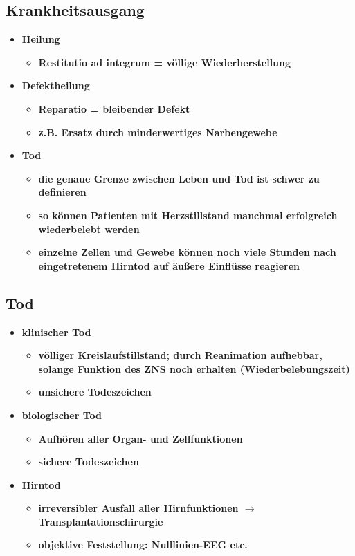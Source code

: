 \subsection{Krankheitsausgang}
	\begin{itemize}
		\item \textbf{Heilung}
			\begin{itemize}
				\item \textbf{Restitutio ad integrum = völlige Wiederherstellung}
			\end{itemize}
		\item \textbf{Defektheilung}
			\begin{itemize}
				\item \textbf{Reparatio = bleibender Defekt}
				\item \textbf{z.B. Ersatz durch minderwertiges Narbengewebe}
			\end{itemize}
		\item \textbf{Tod}
			\begin{itemize}
				\item \textbf{die genaue Grenze zwischen Leben und Tod ist schwer zu definieren}
				\item \textbf{so können Patienten mit Herzstillstand manchmal erfolgreich wiederbelebt werden}
				\item \textbf{einzelne Zellen und Gewebe können noch viele Stunden nach eingetretenem Hirntod auf äußere Einflüsse reagieren}
			\end{itemize}
	\end{itemize}

\subsection{Tod}
	\begin{itemize}
		\item \textbf{klinischer Tod}
			\begin{itemize}
				\item \textbf{völliger Kreislaufstillstand; durch Reanimation aufhebbar, solange Funktion des ZNS noch erhalten (Wiederbelebungszeit)}
				\item \textbf{unsichere Todeszeichen}
			\end{itemize}
		\item \textbf{biologischer Tod}
			\begin{itemize}
				\item \textbf{Aufhören aller Organ- und Zellfunktionen}
				\item \textbf{sichere Todeszeichen}
			\end{itemize}
		\item \textbf{Hirntod}
			\begin{itemize}
				\item \textbf{irreversibler Ausfall aller Hirnfunktionen  $\rightarrow$  Transplantationschirurgie}
				\item \textbf{objektive Feststellung: Nulllinien-EEG etc.}
			\end{itemize}
	\end{itemize}

